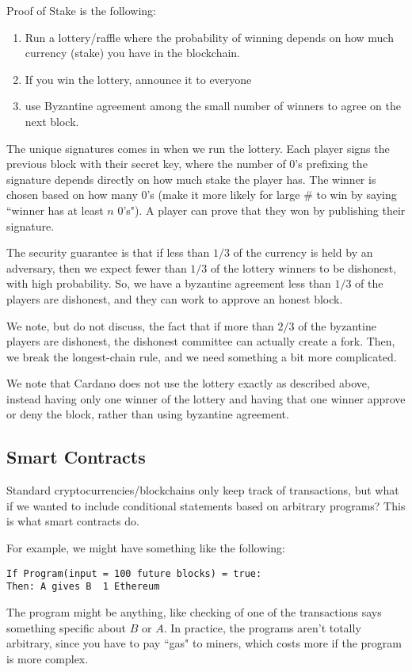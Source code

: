 \documentclass[11pt]{article}
\begin{document}
Proof of Stake is the following:
\begin{enumerate}
\item Run a lottery/raffle where the probability of winning depends on how much currency (stake) you have in the blockchain.
\item If you win the lottery, announce it to everyone
\item use Byzantine agreement among the small number of winners to agree on the next block.
\end{enumerate}

The unique signatures comes in when we run the lottery. 
Each player signs the previous block with their secret key, where the number of \(0\)'s prefixing the signature depends directly on how much stake the player has.
The winner is chosen based on how many \(0\)'s (make it more likely for large \# to win by saying ``winner has at least \(n\) \(0\)'s").
A player can prove that they won by publishing their signature.\medskip

The security guarantee is that if less than \(1/3\) of the currency is held by an adversary, then we expect fewer than \(1/3\) of the lottery winners to be dishonest, with high probability.
So, we have a byzantine agreement less than \(1/3\) of the players are dishonest, and they can work to approve an honest block.\smallskip

We note, but do not discuss, the fact that if more than \(2/3\) of the byzantine players are dishonest, the dishonest committee can actually create a fork.
Then, we break the longest-chain rule, and we need something a bit more complicated.\smallskip

We note that Cardano does not use the lottery exactly as described above, instead having only one winner of the lottery and having that one winner approve or deny the block, rather than using byzantine agreement.

\subsection{Smart Contracts}
Standard cryptocurrencies/blockchains only keep track of transactions, but what if we wanted to include conditional statements based on arbitrary programs?
This is what smart contracts do.

For example, we might have something like the following:
\begin{verbatim}
If Program(input = 100 future blocks) = true:
Then: A gives B  1 Ethereum
\end{verbatim}

The program might be anything, like checking of one of the transactions says something specific about \(B\) or \(A\).
In practice, the programs aren't totally arbitrary, since you have to pay ``gas" to miners, which costs more if the program is more complex.
\end{document}
